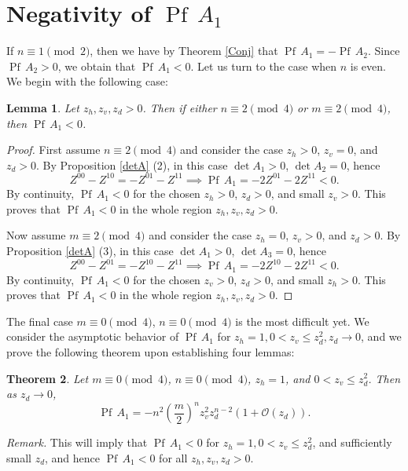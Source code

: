 \documentclass[12pt,reqno]{amsart}
\numberwithin{equation}{section}
\newcommand{\Pf}{{\operatorname{Pf}\,}}
\newtheorem{theo}{{\sc \bf Theorem}}[section]
\newtheorem{lem}[theo]{{\sc \bf Lemma}}
\begin{document}
\section{Negativity of $\Pf A_1$} \label{A1}

If $n\equiv 1\pmod 2$, then we have by Theorem \ref{Conj} that $\Pf A_1=-\Pf A_2$. Since  $\Pf A_2>0$, we obtain that $\Pf A_1<0$. Let us turn to the case when $n$ is even. 
We begin with the following case:

\begin{lem} Let $z_h,z_v,z_d>0$. Then if either $n\equiv 2 \pmod 4$ or $m\equiv 2 \pmod 4$, then $\Pf A_1<0$. 
\end{lem}

\begin{proof} First assume $n\equiv 2\pmod 4$ and consider the case $z_h>0$, $z_v=0$, and $z_d>0$. 
By Proposition \ref{detA} (2),
in this case $\det A_1>0$, $\det A_2=0$, hence
\begin{equation}\label{a15a}
Z^{00}-Z^{10}=-Z^{01}-Z^{11} \implies  \Pf A_1= -2Z^{01}-2Z^{11}<0.
\end{equation}
By continuity, $\Pf A_1<0$ for the chosen $z_h>0$, $z_d>0$, and small $z_v>0$.
This proves that $\Pf A_1<0$ in the whole region
$z_h,z_v,z_d>0$.

Now assume $m\equiv 2\pmod 4$ and consider the case $z_h=0$, $z_v>0$, and $z_d>0$. 
By Proposition \ref{detA} (3),
in this case $\det A_1>0$, $\det A_3=0$, hence
\begin{equation}\label{a15b}
Z^{00}-Z^{01}=-Z^{10}-Z^{11} \implies  \Pf A_1= -2Z^{10}-2Z^{11}<0.
\end{equation}
By continuity, $\Pf A_1<0$ for the chosen $z_v>0$, $z_d>0$, and small $z_h>0$.
This proves that $\Pf A_1<0$ in the whole region
$z_h,z_v,z_d>0$.
\end{proof}

The final case $m\equiv 0\pmod 4$, $n\equiv 0\pmod 4$ is the most difficult yet. We consider the asymptotic behavior of $\Pf A_1$ for $z_h=1, 0<z_v\le z_d^2, z_d\to 0$, and we prove the following theorem upon establishing four lemmas:
\begin{theo}\label{theo44.1}
Let $m\equiv 0\pmod 4$, $n\equiv 0\pmod 4$, $z_h=1$, and $0<z_v\le z_d^2$. Then as $z_d\to 0$,\[\Pf A_1=-n^2\left(\frac{m}{2}\right)^nz_v^2z_d^{n-2}\left(1+\mathcal O \left(z_d\right)\right).\]
\end{theo}

\textit{Remark.} This will imply that $\Pf A_1<0$ for $z_h=1, 0<z_v\le z_d^2$, and sufficiently small $z_d$, and hence $\Pf A_1<0$ for all $z_h,z_v,z_d>0$.
\end{document}
